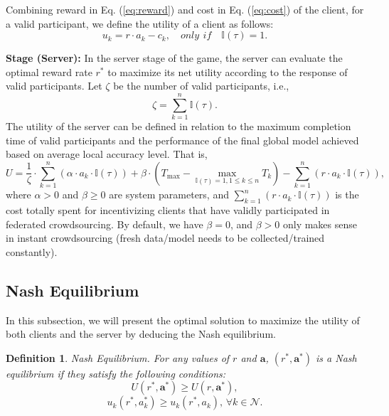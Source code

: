 \documentclass[final,1p,times]{elsarticle}
\newtheorem{myDef}{Definition}
\begin{document}
Combining reward in Eq. (\ref{eq:reward}) and cost in Eq. (\ref{eq:cost}) of the client, for a valid participant, we define the utility of a client as follows:
\begin{equation}\label{eq:client-u}
	u_k = r\cdot a_k - c_k, \quad only\,\: if\quad\mathbb{I}(\tau) = 1.
\end{equation}

\textbf{Stage \uppercase\expandafter{} (Server):} In the server stage of the game, the server can evaluate the optimal reward rate $r^\ast$ to maximize its net utility according to the response of valid participants. Let $\zeta$ be the number of valid participants, i.e.,
\begin{equation}
	\zeta = \sum_{k=1}^n\mathbb{I}(\tau).
\end{equation}
The utility of the server can be defined in relation to the maximum completion time of valid participants and the performance of the final global model achieved based on average local accuracy level. That is, 
\begin{equation}\label{Eq:server-u}
	U = \frac{1}{\zeta}\cdot \sum_{k=1}^n\left(\alpha\cdot a_k\cdot \mathbb{I}(\tau)\right) + \beta\cdot(T_{\max}-\max_{\mathbb{I}(\tau)=1,1\le k\le n}T_k) - \sum_{k=1}^n\left(r\cdot a_k\cdot \mathbb{I}(\tau)\right),
\end{equation}
where $\alpha > 0$ and $\beta \ge 0$ are system parameters, and $\sum_{k=1}^n(r\cdot a_k\cdot \mathbb{I}(\tau))$ is the cost totally spent for incentivizing clients that have validly participated in federated crowdsourcing. By default, we have $\beta = 0$, and $\beta > 0$ only makes sense in instant crowdsourcing (fresh data/model needs to be collected/trained constantly).

\subsection{Nash Equilibrium}
In this subsection, we will present the optimal solution to maximize the utility of both clients and the server by deducing the Nash equilibrium.

\begin{myDef}
	Nash Equilibrium. For any values of $r$ and $\bm{a}$, $(r^\ast,\bm{a}^\ast)$ is a Nash equilibrium if they satisfy the following conditions:
	\begin{equation}
		U(r^\ast,\bm{a}^\ast) \ge U(r,\bm{a}^\ast),
	\end{equation}	
	\begin{equation}
		u_k(r^\ast,a_k^\ast) \ge u_k(r^\ast,a_k),\, \forall k \in \bm{\mathcal{N}}.
	\end{equation}	
\end{myDef}
\end{document}
